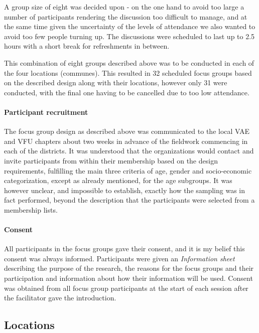 \documentclass[]{article}
\let\oldparagraph\paragraph
\renewcommand{\paragraph}[1]{\oldparagraph{#1}\mbox{}}
\begin{document}
A group size of eight was decided upon - on the one hand to avoid too
large a number of participants rendering the discussion too difficult to
manage, and at the same time given the uncertainty of the levels of
attendance we also wanted to avoid too few people turning up. The
discussions were scheduled to last up to 2.5 hours with a short break
for refreshments in between.

This combination of eight groups described above was to be conducted in
each of the four locations (communes). This resulted in 32 scheduled
focus groups based on the described design along with their locations,
however only 31 were conducted, with the final one having to be
cancelled due to too low attendance.

\hypertarget{participant-recruitment}{%
\paragraph{Participant recruitment}\label{participant-recruitment}}

The focus group design as described above was communicated to the local
VAE and VFU chapters about two weeks in advance of the fieldwork
commencing in each of the districts. It was understood that the
organizations would contact and invite participants from within their
membership based on the design requirements, fulfilling the main three
criteria of age, gender and socio-economic categorization, except as
already mentioned, for the age subgroups. It was however unclear, and
impossible to establish, exactly how the sampling was in fact performed,
beyond the description that the participants were selected from a
membership lists.

\hypertarget{consent}{%
\paragraph{Consent}\label{consent}}

All participants in the focus groups gave their consent, and it is my
belief this consent was always informed. Participants were given an
\emph{Information sheet} describing the purpose of the research, the
reasons for the focus groups and their participation and information
about how their information will be used. Consent was obtained from all
focus group participants at the start of each session after the
facilitator gave the introduction.

\hypertarget{locations}{%
\subsection{Locations}\label{locations}}
\end{document}
